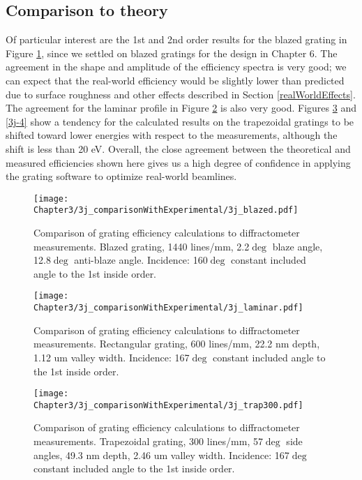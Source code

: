 \subsection{Comparison to theory}
Of particular interest are the 1st and 2nd order results for the blazed grating in Figure \ref{3j-1}, since we settled on blazed gratings for the design in Chapter 6.  The agreement in the shape and amplitude of the efficiency spectra is very good; we can expect that the real-world efficiency would be slightly lower than predicted due to surface roughness and other effects described in Section \ref{realWorldEffects}.  The agreement for the laminar profile in Figure \ref{3j-2} is also very good.  Figures \ref{3j-3} and \ref{3j-4} show a tendency for the calculated results on the trapezoidal gratings to be shifted toward lower energies with respect to the measurements, although the shift is less than 20 eV.  Overall, the close agreement between the theoretical and measured efficiencies shown here gives us a high degree of confidence in applying the grating software to optimize real-world beamlines.
 
\begin{figure}[htbp] %
   \centering
   \texttt{[image: Chapter3/3j\_comparisonWithExperimental/3j\_blazed.pdf]} 
   \caption{Comparison of grating efficiency calculations to diffractometer measurements.  Blazed grating, 1440 lines/mm, 2.2$\deg$ blaze angle, 12.8$\deg$ anti-blaze angle. Incidence: 160$\deg$ constant included angle to the 1st inside order.}
   \label{3j-1}
\end{figure}

\begin{figure}[htbp] %
   \centering
   \texttt{[image: Chapter3/3j\_comparisonWithExperimental/3j\_laminar.pdf]} 
   \caption{Comparison of grating efficiency calculations to diffractometer measurements.  Rectangular grating, 600 lines/mm, 22.2 nm depth, 1.12 um valley width.  Incidence: 167$\deg$ constant included angle to the 1st inside order.}
   \label{3j-2}
\end{figure}

\begin{figure}[htbp] %
   \centering
   \texttt{[image: Chapter3/3j\_comparisonWithExperimental/3j\_trap300.pdf]} 
   \caption{Comparison of grating efficiency calculations to diffractometer measurements.  Trapezoidal grating, 300 lines/mm, 57$\deg$ side angles, 49.3 nm depth, 2.46 um valley width.  Incidence: 167$\deg$ constant included angle to the 1st inside order.}
   \label{3j-3}
\end{figure}

